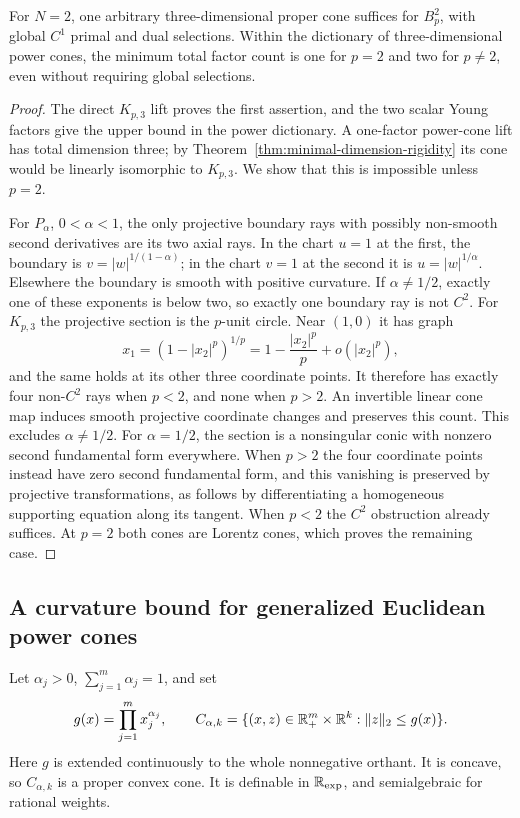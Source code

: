 \begin{proposition}
\label{prop:lp-two-dimensional-power}
For $N=2$, one arbitrary three-dimensional proper cone suffices for
$B_p^2$, with global $C^1$ primal and dual selections. Within the
dictionary of three-dimensional power cones, the minimum total factor
count is one for $p=2$ and two for $p\ne2$, even without requiring
global selections.
\end{proposition}
\begin{proof}
The direct $K_{p,3}$ lift proves the first assertion, and the two scalar
Young factors give the upper bound in the power dictionary. A one-factor
power-cone lift has total dimension three; by
Theorem~\ref{thm:minimal-dimension-rigidity} its cone would be linearly
isomorphic to $K_{p,3}$. We show that this is impossible unless $p=2$.

For $P_\alpha$, $0<\alpha<1$, the only projective boundary rays with
possibly non-smooth second derivatives are its two axial rays. In the
chart $u=1$ at the first, the boundary is
$v=|w|^{1/(1-\alpha)}$; in the chart $v=1$ at the second it is
$u=|w|^{1/\alpha}$. Elsewhere the boundary is smooth with positive
curvature. If $\alpha\ne1/2$, exactly one of these exponents is below
two, so exactly one boundary ray is not $C^2$. For $K_{p,3}$ the
projective section is the $p$-unit circle. Near $(1,0)$ it has graph
\[
 x_1=(1-|x_2|^p)^{1/p}
     =1-\frac{|x_2|^p}{p}+o(|x_2|^p),
\]
and the same holds at its other three coordinate points. It therefore
has exactly four non-$C^2$ rays when $p<2$, and none when $p>2$.
An invertible linear cone map induces smooth projective coordinate
changes and preserves this count. This excludes $\alpha\ne1/2$.
For $\alpha=1/2$, the section is a nonsingular conic with nonzero
second fundamental form everywhere. When $p>2$ the four coordinate
points instead have zero second fundamental form, and this vanishing
is preserved by projective transformations, as follows
by differentiating a homogeneous supporting equation along its tangent. When $p<2$ the
$C^2$ obstruction already suffices. At $p=2$ both cones are Lorentz
cones, which proves the remaining case.
\end{proof}

\subsection{A curvature bound for generalized Euclidean power cones}
Let $\alpha_j>0$, $\sum_{j=1}^m\alpha_j=1$, and set
\[
 g(x)=\prod_{j=1}^m x_j^{\alpha_j},\qquad
 C_{\alpha,k}=\{(x,z)\in\mathbb R_+^m\times\mathbb R^k:
                       \lVert z\rVert_2\leq g(x)\}.
\]
Here $g$ is extended continuously to the whole nonnegative orthant.
It is concave, so $C_{\alpha,k}$ is a proper convex cone. It is
definable in $\mathbb R_{\exp}$, and semialgebraic for rational weights.

